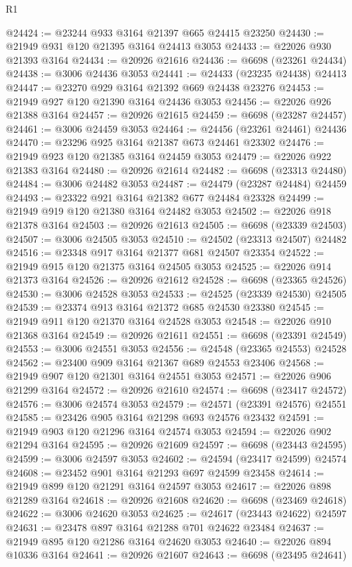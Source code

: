 \begin{lexlean}{R1}
\begin{coremodule}
@24424 := @23244 @933 @3164 @21397 @665 @24415 @23250
@24430 := @21949 @931 @120 @21395 @3164 @24413 @3053
@24433 := @22026 @930 @21393 @3164
@24434 := @20926 @21616
@24436 := @6698 (@23261 @24434)
@24438 := @3006 @24436 @3053
@24441 := @24433 (@23235 @24438) @24413
@24447 := @23270 @929 @3164 @21392 @669 @24438 @23276
@24453 := @21949 @927 @120 @21390 @3164 @24436 @3053
@24456 := @22026 @926 @21388 @3164
@24457 := @20926 @21615
@24459 := @6698 (@23287 @24457)
@24461 := @3006 @24459 @3053
@24464 := @24456 (@23261 @24461) @24436
@24470 := @23296 @925 @3164 @21387 @673 @24461 @23302
@24476 := @21949 @923 @120 @21385 @3164 @24459 @3053
@24479 := @22026 @922 @21383 @3164
@24480 := @20926 @21614
@24482 := @6698 (@23313 @24480)
@24484 := @3006 @24482 @3053
@24487 := @24479 (@23287 @24484) @24459
@24493 := @23322 @921 @3164 @21382 @677 @24484 @23328
@24499 := @21949 @919 @120 @21380 @3164 @24482 @3053
@24502 := @22026 @918 @21378 @3164
@24503 := @20926 @21613
@24505 := @6698 (@23339 @24503)
@24507 := @3006 @24505 @3053
@24510 := @24502 (@23313 @24507) @24482
@24516 := @23348 @917 @3164 @21377 @681 @24507 @23354
@24522 := @21949 @915 @120 @21375 @3164 @24505 @3053
@24525 := @22026 @914 @21373 @3164
@24526 := @20926 @21612
@24528 := @6698 (@23365 @24526)
@24530 := @3006 @24528 @3053
@24533 := @24525 (@23339 @24530) @24505
@24539 := @23374 @913 @3164 @21372 @685 @24530 @23380
@24545 := @21949 @911 @120 @21370 @3164 @24528 @3053
@24548 := @22026 @910 @21368 @3164
@24549 := @20926 @21611
@24551 := @6698 (@23391 @24549)
@24553 := @3006 @24551 @3053
@24556 := @24548 (@23365 @24553) @24528
@24562 := @23400 @909 @3164 @21367 @689 @24553 @23406
@24568 := @21949 @907 @120 @21301 @3164 @24551 @3053
@24571 := @22026 @906 @21299 @3164
@24572 := @20926 @21610
@24574 := @6698 (@23417 @24572)
@24576 := @3006 @24574 @3053
@24579 := @24571 (@23391 @24576) @24551
@24585 := @23426 @905 @3164 @21298 @693 @24576 @23432
@24591 := @21949 @903 @120 @21296 @3164 @24574 @3053
@24594 := @22026 @902 @21294 @3164
@24595 := @20926 @21609
@24597 := @6698 (@23443 @24595)
@24599 := @3006 @24597 @3053
@24602 := @24594 (@23417 @24599) @24574
@24608 := @23452 @901 @3164 @21293 @697 @24599 @23458
@24614 := @21949 @899 @120 @21291 @3164 @24597 @3053
@24617 := @22026 @898 @21289 @3164
@24618 := @20926 @21608
@24620 := @6698 (@23469 @24618)
@24622 := @3006 @24620 @3053
@24625 := @24617 (@23443 @24622) @24597
@24631 := @23478 @897 @3164 @21288 @701 @24622 @23484
@24637 := @21949 @895 @120 @21286 @3164 @24620 @3053
@24640 := @22026 @894 @10336 @3164
@24641 := @20926 @21607
@24643 := @6698 (@23495 @24641)

\end{coremodule}
\end{lexlean}
